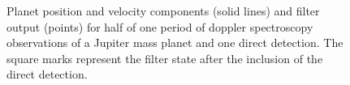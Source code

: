 \begin{figure}[ht]
 \begin{center}
 \end{center}
 \caption[Filter output for RV and imaging]{Planet position and velocity components (solid lines) and filter output (points) for half of one period of doppler spectroscopy observations of a Jupiter mass planet and one direct detection.  The square marks represent the filter state after the inclusion of the direct detection. \label{fig:filtOutRVdd}}
  \end{figure}
